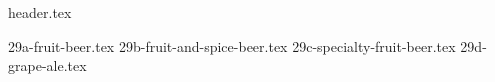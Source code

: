 \clearpage
{}
\divisorLine

{header.tex}

\begin{multicols}{2}

{29a-fruit-beer.tex}
{29b-fruit-and-spice-beer.tex}
{29c-specialty-fruit-beer.tex}
{29d-grape-ale.tex}

\end{multicols}